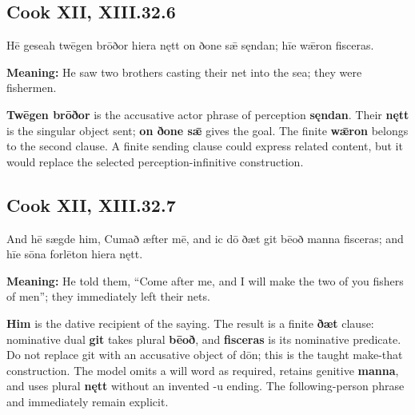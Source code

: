 \par\begin{minipage}{\linewidth}\raggedright
\subsection*{Cook XII, XIII.32.6}

Hē geseah twēgen brōðor hiera nętt on ðone sǣ sęndan; hīe wǣron fisceras.

\textbf{Meaning:} He saw two brothers casting their net into the sea; they were fishermen.

\textbf{Twēgen brōðor} is the accusative actor phrase of perception \textbf{sęndan}. Their \textbf{nętt} is the singular object sent; \textbf{on ðone sǣ} gives the goal. The finite \textbf{wǣron} belongs to the second clause. A finite sending clause could express related content, but it would replace the selected perception-infinitive construction.

\end{minipage}\par\addvspace{4pt}

\par\begin{minipage}{\linewidth}\raggedright
\subsection*{Cook XII, XIII.32.7}

And hē sægde him, Cumað æfter mē, and ic dō ðæt git bēoð manna fisceras; and hīe sōna forlēton hiera nętt.

\textbf{Meaning:} He told them, “Come after me, and I will make the two of you fishers of men”; they immediately left their nets.

\textbf{Him} is the dative recipient of the saying. The result is a finite \textbf{ðæt} clause: nominative dual \textbf{git} takes plural \textbf{bēoð}, and \textbf{fisceras} is its nominative predicate. Do not replace git with an accusative object of dōn; this is the taught make-that construction. The model omits a will word as required, retains genitive \textbf{manna}, and uses plural \textbf{nętt} without an invented -u ending. The following-person phrase and immediately remain explicit.

\end{minipage}\par\addvspace{4pt}

